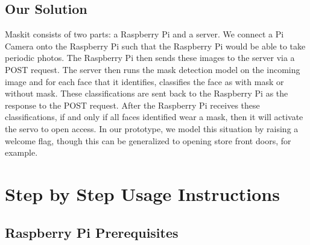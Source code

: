 \documentclass[conference, 12pt, onecolumn]{IEEEtran}
\begin{document}
\subsection{Our Solution}
Maskit consists of two parts: a Raspberry Pi and a server. We connect a Pi Camera onto the Raspberry Pi such that the Raspberry Pi would be able to take periodic photos. The Raspberry Pi then sends these images to the server via a POST request.
The server then runs the mask detection model on the incoming image and for each face that it identifies, classifies the face as with mask or without mask. These classifications are sent back to the Raspberry Pi as the response to the POST request.
After the Raspberry Pi receives these classifications, if and only if all faces identified wear a mask, then it will activate the servo to open access. In our prototype, we model this situation by raising a welcome flag, though this can be generalized to opening store front doors, for example.


\section{Step by Step Usage Instructions}
\subsection{Raspberry Pi Prerequisites}
\end{document}
